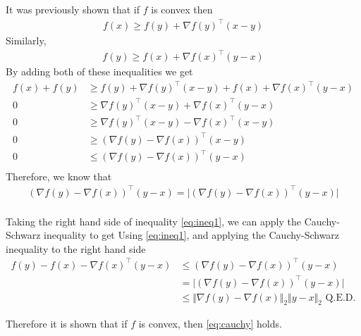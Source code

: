 \documentclass{exam}
\begin{document}
\begin{questions}
\begin{parts}
{            It was previously shown that if $f$ is convex then
            \begin{align*}
                f(x) \geq f(y) + \nabla f(y)^\top(x - y)
            \end{align*}
            Similarly,
            \begin{align*}
                f(y) \geq f(x) + \nabla f(x)^\top(y - x)
            \end{align*}
            By adding both of these inequalities we get
            \begin{align*}
                f(x) + f(y) & \geq f(y) + \nabla f(y)^\top(x - y) + f(x) + \nabla f(x)^\top(y - x) \\
                0 & \geq\nabla f(y)^\top(x - y) + \nabla f(x)^\top(y - x) \\
                0 & \geq\nabla f(y)^\top(x - y) - \nabla f(x)^\top(x - y) \\
                0 & \geq (\nabla f(y) - \nabla f(x))^\top(x - y) \\
                0 & \leq (\nabla f(y) - \nabla f(x))^\top(y - x) \\
            \end{align*}
            Therefore, we know that
            \begin{align*}
                (\nabla f(y) - \nabla f(x))^\top(y - x) = \vert (\nabla f(y) - \nabla f(x))^\top(y - x) \vert \\
            \end{align*}

            Taking the right hand side of inequality \eqref{eq:ineq1}, we can apply the Cauchy-Schwarz inequality to get
            Using \eqref{eq:ineq1}, and applying the Cauchy-Schwarz inequality to the right hand side
            \begin{align*}
                f(y) - f(x) - \nabla f(x)^\top(y - x) & \leq (\nabla f(y) - \nabla f(x))^\top(y - x)                                    \\
                                                      & = \vert (\nabla f(y) - \nabla f(x))^\top(y - x) \vert                           \\
                                                      & \leq \Vert \nabla f(y) - \nabla f(x) \Vert_2 \Vert y - x \Vert_2 \text{ Q.E.D.}
            \end{align*}

            Therefore it is shown that if $f$ is convex, then \eqref{eq:cauchy} holds.
        }


\end{parts}
\end{questions}
\end{document}
